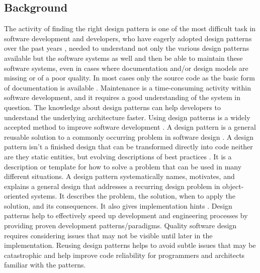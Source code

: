 \documentclass[sigplan,12pt,nonacm=true,review=false]{acmart}
\begin{document}
\subsection{Background}
The activity of finding the right design pattern is one of the most difficult task in software development \cite{hasheminejad_design_2012} and developers, who have eagerly adopted design patterns over the past years \cite{wendorff_assessment_2001}, needed to understand not only the various design patterns available \cite{riehle_understanding_1996} but the software systems as well and then be able to maintain these software systems, even in cases where documentation and/or design models are missing or of a poor quality. In most cases only the source code as the basic form of documentation is available \cite{streitferdt_searching_2005}. Maintenance is a time-consuming activity within software development, and it requires a good understanding of the system in question. The knowledge about design patterns can help developers to understand the underlying architecture faster. Using design patterns is a widely accepted method to improve software development \cite{hahsler_quantitative_2003}.
A design pattern is a general reusable solution to a commonly occurring \cite{hussain_software_2017} problem in software design \cite{antoniol_object-oriented_2001, coplien_software_1998, noauthor, noauthor_design_nodate-6}. A design pattern isn't a finished design that can be transformed directly into code neither are they static entities, but evolving descriptions of best practices \cite{heer_software_2006}. It is a description or template for how to solve a problem that can be used in many different situations. A design pattern systematically names, motivates, and explains a general design that addresses a recurring design problem in object-oriented systems. It describes the problem, the solution, when to apply the solution, and its consequences. It also gives implementation hints \cite{noauthor_design_2015, schaffer_round-trip_1999}.
Design patterns help to effectively speed up development and engineering processes by providing proven development patterns/paradigms. Quality software design requires considering issues that may not be visible until later in the implementation. Reusing design patterns helps to avoid subtle issues that may be catastrophic and help improve code reliability for programmers and architects familiar with the patterns. 
\end{document}
